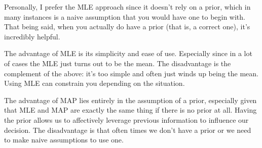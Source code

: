 \documentclass{article}
\begin{document}
Personally, I prefer the MLE approach since it doesn't rely on a prior, which in many instances is a naive assumption that you would have one to begin with. That being said, when you actually do have a prior (that is, a correct one), it's incredibly helpful.

The advantage of MLE is its simplicity and ease of use. Especially since in a lot of cases the MLE just turns out to be the mean. The disadvantage is the complement of the above: it's too simple and often just winds up being the mean. Using MLE can constrain you depending on the situation.

The advantage of MAP lies entirely in the assumption of a prior, especially given that MLE and MAP are exactly the same thing if there is no prior at all. Having the prior allows us to affectively leverage previous information to influence our decision. The disadvantage is that often times we don't have a prior or we need to make naive assumptions to use one.
\end{document}
